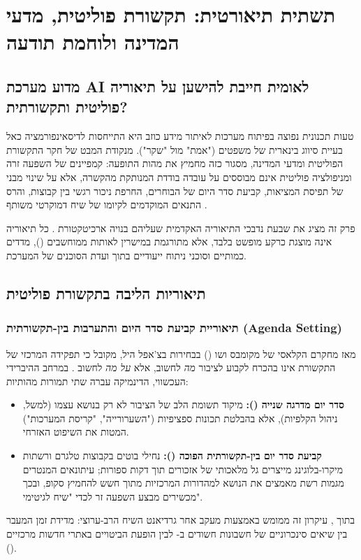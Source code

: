 \chapter{תשתית תיאורטית: תקשורת פוליטית, מדעי המדינה ולוחמת תודעה}
\label{ch:theory}

\section{מדוע מערכת AI לאומית חייבת להישען על תיאוריה פוליטית ותקשורתית?}
טעות תכנונית נפוצה בפיתוח מערכות לאיתור מידע כוזב היא התייחסות לדיסאינפורמציה כאל בעיית סיווג בינארית של משפטים ("אמת" מול "שקר"). מנקודת המבט של חקר התקשורת הפוליטית ומדעי המדינה, מסגור כזה מחמיץ את מהות התופעה: קמפיינים של השפעה זרה ומניפולציה פוליטית אינם מבוססים על עובדה בודדת המנותקת מהקשרה, אלא על שינוי מבני של תפיסת המציאות, קביעת סדר היום של הבוחרים, החרפת ניכור רגשי בין קבוצות, והרס התנאים המוקדמים לקיומו של שיח דמוקרטי משותף \cite{lazer2018, walker2018}.

פרק זה מציג את שבעת נדבכי התיאוריה האקדמית שעליהם בנויה ארכיטקטורת . כל תיאוריה אינה מוצגת כרקע מופשט בלבד, אלא מתורגמת במישרין לאותות ממוחשבים (), מדדים כמותיים וסוכני ניתוח ייעודיים בתוך ועדת הסוכנים של המערכת.

\section{תיאוריות הליבה בתקשורת פוליטית}

\subsection{תיאוריית קביעת סדר היום והתערבות בין-תקשורתית (Agenda Setting)}
מאז מחקרם הקלאסי של מקומבס ושו () בבחירות בצ'אפל היל, מקובל כי תפקידה המרכזי של התקשורת אינו בהכרח לקבוע לציבור \emph{מה} לחשוב, אלא \emph{על מה} לחשוב \cite{mccombs1972}. במרחב ההיברידי העכשווי, הדינמיקה עברה שתי תמורות מהותיות:
\begin{itemize}
    \item \textbf{סדר יום מדרגה שנייה ():} מיקוד תשומת הלב של הציבור לא רק בנושא עצמו (למשל, ניהול הקלפיות), אלא בהבלטת תכונות ספציפיות ("השערורייה", "קריסת המערכות") המטות את השיפוט האזרחי.
    \item \textbf{קביעת סדר יום בין-תקשורתית הפוכה ():} נחילי בוטים בקבוצות טלגרם ורשתות מיקרו-בלוגינג מייצרים גל מלאכותי של אזכורים תוך דקות ספורות; עיתונאים המנטרים מגמות רשת מאמצים את הנושא למהדורות המרכזיות מתוך חשש להחמיץ סקופ, ובכך מכשירים מבצע השפעה זר לכדי "שיח לגיטימי".
\end{itemize}
בתוך , עיקרון זה ממומש באמצעות מעקב אחר גרדיאנט השיח הרב-ערוצי: מדידת זמן המעבר בין שיאים סינכרוניים של חשבונות חשודים ב- לבין הופעת הביטויים באתרי חדשות מרכזיים ().

